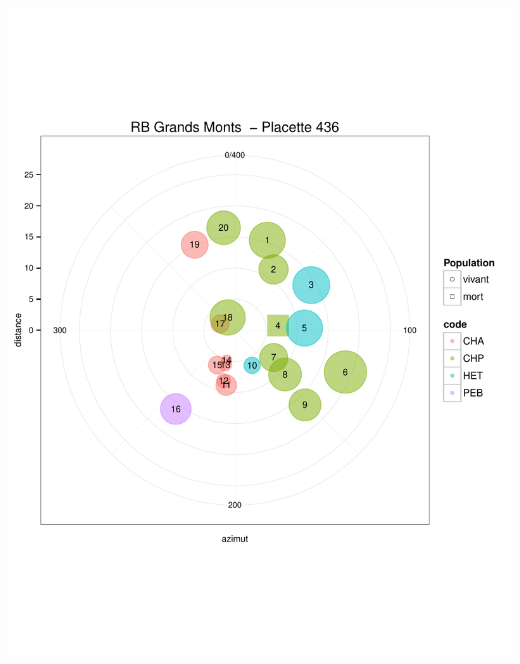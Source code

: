 \documentclass[a4paper]{book}\usepackage[]{graphicx}\usepackage[]{color}
\makeatletter
\def\maxwidth{ %
  \ifdim\Gin@nat@width>\linewidth
    \linewidth
  \else
    \Gin@nat@width
  \fi
}
\newenvironment{knitrout}{}{} %
\makeatother
\begin{document}
\begin{knitrout}
{\centering \includegraphics[width=\maxwidth]{Figures/PlanArbres-43} 

}





\end{knitrout}
\end{document}
